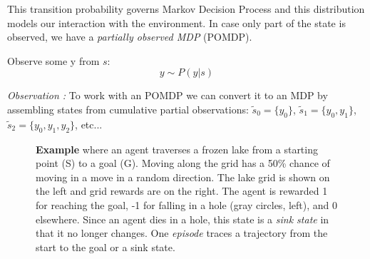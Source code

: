 \documentclass{article}
\begin{document}

This transition probability governs Markov Decision Process and this distribution models our interaction with the environment. In case only part of the state is observed, we have a \textit{partially observed MDP} (POMDP).

\begin{defn}
Observe some y from $s$:\[
y\sim P(y|s)
\]
\end{defn}
\textit{Observation :} To work with an POMDP we can convert it to an MDP by assembling states from cumulative partial observations: $\tilde s_{0}=\{y_{0}\}$, $\tilde s_{1}=\{y_{0},y_{1}\}$, $\tilde s_{2}=\{y_{0},y_{1},y_{2}\}$, etc... \\

\begin{figure}
    \centering
    \caption{\textbf{Example} where an agent traverses a frozen lake from a starting point (S) to a goal (G). Moving along the grid has a 50\% chance of moving in a move in a random direction. The lake grid is shown on the left and grid rewards are on the right. The agent is rewarded 1 for reaching the goal, -1 for falling in a hole (gray circles, left), and 0 elsewhere. Since an agent dies in a hole, this state is a \textit{sink state} in that it no longer changes. One \textit{episode} traces a trajectory from the start to the goal or a sink state.}
    \label{fig:eg_frozen_lake}
\end{figure}
\end{document}
